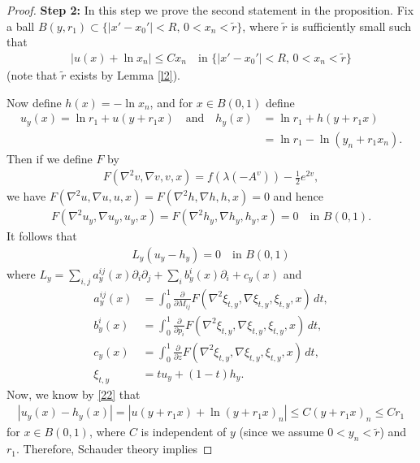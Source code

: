 \documentclass[12pt]{article}
\numberwithin{equation}{section}
\theoremstyle{plain}
\theoremstyle{definition}
\begin{document}
\begin{proof}
	
	
	\noindent\textbf{Step 2:} In this step we prove the second statement in the proposition. Fix a ball $B(y, r_1) \subset \{|x'-x_0'| < R,\,0<x_n < \widetilde{r}\}$, where $\widetilde{r}$ is sufficiently small such that 
	\begin{align}\label{22}
	|u(x) + \ln x_n| \leq Cx_n \quad \text{in }  \{|x'-x_0'| < R,\,0<x_n < \widetilde{r}\}
	\end{align}
	(note that $\widetilde{r}$ exists by Lemma \ref{l2}).\medskip 
	
	Now define $h(x) = -\ln x_n$, and for $x\in B(0,1)$ define 
	\begin{align*}
	u_y(x) = \ln r_1 + u(y+r_1 x) \quad \text{and} \quad h_y(x) & = \ln r_1 + h(y+r_1 x) \nonumber \\
	& = \ln r_1 - \ln (y_n + r_1 x_n). 
	\end{align*}
	Then if we define $F$ by
	\begin{align*}
	F(\nabla^2 v, \nabla v, v, x) = f(\lambda(-A^v)) - \frac{1}{2}e^{2v},
	\end{align*}
	we have $F(\nabla^2 u, \nabla u , u, x) = F(\nabla^2 h, \nabla h, h, x) = 0$ and hence
	\begin{align*}
	F(\nabla^2 u_y, \nabla u_y, u_y, x) = F(\nabla^2 h_y, \nabla h_y, h_y, x) = 0 \quad \text{in }B(0,1).
	\end{align*}
It follows that
	\begin{align*}
	L_y (u_y - h_y) = 0 \quad\text{in }B(0,1)
	\end{align*}
	where $L_y = \sum_{i,j} a^{ij}_y(x)\partial_i\partial_j + \sum_i b^i_y(x)\partial_i + c_y(x)$ and
	\begin{align*}
	a^{ij}_y(x) & = \int_0^1 \frac{\partial}{\partial M_{ij}}F(\nabla^2 \xi_{t,y}, \nabla \xi_{t,y}, \xi_{t,y}, x)\,dt, \nonumber \\
	b^i_y(x) & = \int_0^1 \frac{\partial}{\partial p_i}F(\nabla^2 \xi_{t,y}, \nabla \xi_{t,y}, \xi_{t,y}, x)\,dt, \nonumber \\
	c_y(x) & = \int_0^1 \frac{\partial}{\partial z}F(\nabla^2 \xi_{t,y}, \nabla \xi_{t,y}, \xi_{t,y}, x)\,dt, \nonumber \\
	\xi_{t,y} & = tu_y + (1-t)h_y.
	\end{align*}
	Now, we know by \eqref{22} that 
	\begin{align*}
	|u_y(x) - h_y(x)| = |u(y+r_1x) + \ln (y+r_1x)_n| \leq C(y+r_1 x)_n \leq Cr_1 
	\end{align*}
	for $x\in B(0,1)$, where $C$ is independent of $y$ (since we assume $0< y_n < \widetilde{r}$) and $r_1$. Therefore, Schauder theory implies 

\end{proof}
\end{document}
